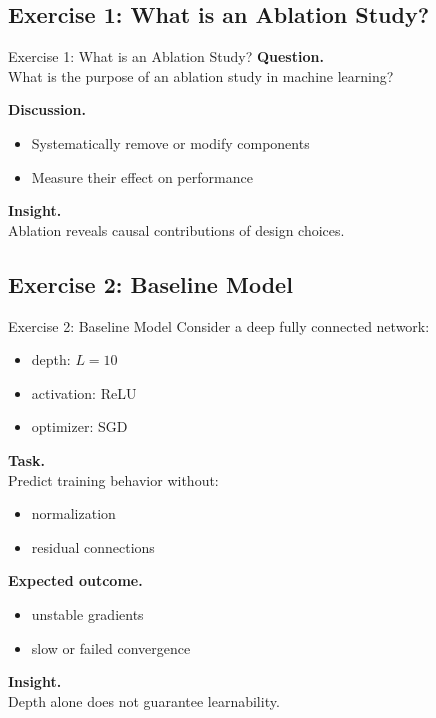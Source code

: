 \documentclass[aspectratio=169,11pt]{beamer}
\begin{document}
\subsection{Exercise 1: What is an Ablation Study?}
\begin{frame}[t,allowframebreaks]{Exercise 1: What is an Ablation Study?}
\small
\textbf{Question.}\\ What is the purpose of an ablation study in machine learning?

\textbf{Discussion.}\\ \begin{itemize}
    \item Systematically remove or modify components
    \item Measure their effect on performance
\end{itemize}

\textbf{Insight.}\\ Ablation reveals causal contributions of design choices.
\end{frame}

\subsection{Exercise 2: Baseline Model}
\begin{frame}[t,allowframebreaks]{Exercise 2: Baseline Model}
\small
Consider a deep fully connected network:

\begin{itemize}
    \item depth: $L = 10$
    \item activation: ReLU
    \item optimizer: SGD
\end{itemize}

\textbf{Task.}\\ Predict training behavior without:
\begin{itemize}
    \item normalization
    \item residual connections
\end{itemize}

\textbf{Expected outcome.}\\ \begin{itemize}
    \item unstable gradients
    \item slow or failed convergence
\end{itemize}

\textbf{Insight.}\\ Depth alone does not guarantee learnability.
\end{frame}
\end{document}
